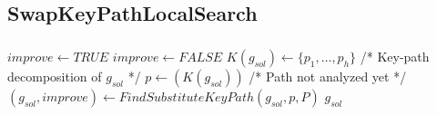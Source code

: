 \subsection{SwapKeyPathLocalSearch}
\begin{frame}\frametitle{}
\begin{block}{}
\begin{algorithm}[H]
\caption{$g_{sol} = SwapKeyPathLocalSearch(G_B,C,g_{sol},P)$}
\begin{algorithmic}[1]
\begin{scriptsize}
\STATE $improve \leftarrow TRUE$
\STATE $improve \leftarrow FALSE$
\STATE $K(g_{sol}) \leftarrow \{p_1,\ldots,p_h\}$ /* Key-path decomposition of $g_{sol}$ */
\STATE $p \leftarrow(K(g_{sol}))$ /* Path not analyzed yet */
\STATE $(g_{sol},improve) \leftarrow FindSubstituteKeyPath(g_{sol},p,P)$
\ENDWHILE
\ENDWHILE
\RETURN $g_{sol}$
\end{scriptsize}
\end{algorithmic}
\end{algorithm}
\end{block}
\end{frame}

